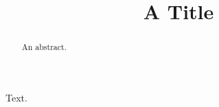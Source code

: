 \documentclass{ptephy_v1}
\begin{document}
\title{A Title}
\author{}
\author{}
\begin{abstract}An abstract.\end{abstract}
\maketitle
Text.
\end{document}
